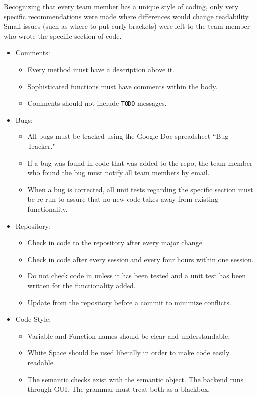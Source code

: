 \documentclass[12pt]{report}
\begin{document}
Recognizing that every team member has a unique style of coding, only very specific recommendations were made where differences would change readability. Small issues (such as where to put curly brackets) were left to the team member who wrote the specific section of code.
\begin{itemize}
\item Comments:
\begin{itemize}
\item Every method must have a description above it.
\item Sophisticated functions must have comments within the body.
\item Comments should not include \texttt{TODO} messages.
\end{itemize}
\item Bugs:
\begin{itemize}
\item All bugs must be tracked using the Google Doc spreadsheet ``Bug Tracker."
\item If a bug was found in code that was added to the repo, the team member who found the bug must notify all team members by email.
\item When a bug is corrected, all unit tests regarding the specific section must be re-run to assure that no new code takes away from existing functionality. 
\end{itemize}
\item Repository:
\begin{itemize}
\item Check in code to the repository after every major change.
\item Check in code after every session and every four hours within one session.
\item Do not check code in unless it has been tested and a unit test has been written for the functionality added.
\item Update from the repository before a commit to minimize conflicts.
\end{itemize}
\item Code Style:
\begin{itemize}
\item Variable and Function names should be clear and understandable.
\item White Space should be used liberally in order to make code easily readable.
\item The semantic checks exist with the semantic object. The backend runs through GUI. The grammar must treat both as a blackbox.

\end{itemize}
\end{itemize}
\end{document}
